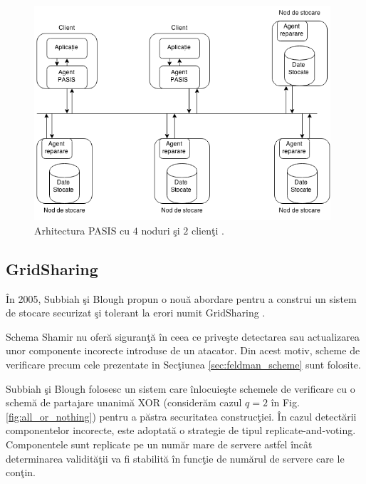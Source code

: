 \documentclass{llncs}
\begin{document}
\begin{figure}
	\includegraphics[width=11cm]{img/PASIS.png}
	\caption{Arhitectura PASIS cu $4$ noduri \c{s}i $2$ clien\c{t}i \cite{W:2000}.}
	\label{fig:pasis}
	\bigskip
\end{figure}

\subsection{GridSharing} 
\label{sec:desc_gridsharing}

\^{I}n 2005, Subbiah \c{s}i Blough propun o nou\u{a} abordare pentru a construi un sistem de stocare securizat \c{s}i tolerant la erori numit GridSharing \cite{SB:2005}.

Schema Shamir nu ofer\u{a} siguran\c{t}\u{a} \^{i}n ceea ce prive\c{s}te detectarea sau actualizarea unor componente incorecte introduse de un atacator.
Din acest motiv, scheme de verificare precum cele prezentate in Sec\c{t}iunea {\ref{sec:feldman_scheme}} sunt folosite.


Subbiah \c{s}i Blough folosesc un sistem care \^{i}nlocuie\c{s}te schemele de verificare cu o schem\u{a} de partajare unanim\u{a} XOR (consider\u{a}m cazul $q = 2$ \^{i}n Fig. \ref{fig:all_or_nothing}) pentru a p\u{a}stra securitatea construc\c{t}iei.
\^{I}n cazul detect\u{a}rii componentelor incorecte, este adoptat\u{a} o strategie de tipul replicate-and-voting.
Componentele sunt replicate pe un num\u{a}r mare de servere astfel \^{i}nc\^{a}t determinarea validit\u{a}\c{t}ii va fi stabilit\u{a} \^{i}n func\c{t}ie de num\u{a}rul de servere care le con\c{t}in.
\end{document}
